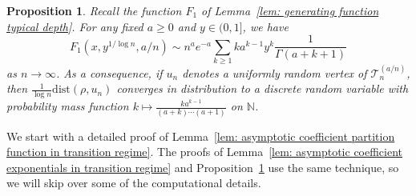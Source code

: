 \documentclass{article}
\newtheorem{proposition}[theorem]{Proposition}
\theoremstyle{remark}
\newcommand{\bN}{\mathbb{N}}
\newcommand{\dist}{\mathrm{dist}}
\newcommand{\cT}{\mathcal{T}}
\begin{document}
\begin{proposition}\label{prop: asymptotic coefficient typical depth in transition regime}
    Recall the function $F_1$ of Lemma~\ref{lem: generating function typical depth}.
    For any fixed $a\ge0$ and $y\in(0,1]$, we have
    \begin{equation*}
        [x^n] F_1{\left( x, y^{1/\log n}, a/n \right)} \sim n^{a} e^{-a} \sum_{k\ge1} k a^{k-1} y^{k} \frac{1}{\Gamma(a+k+1)}
    \end{equation*}
    as $n\to\infty$.
    As a consequence, if $u_n$ denotes a uniformly random vertex of $\cT_n^{(a/n)}$, then $\frac{1}{\log n} \dist(\rho,u_n)$ converges in distribution to a discrete random variable with probability mass function $k\mapsto \frac{k a^{k-1}}{(a+k)\cdots(a+1)}$ on $\bN$.
\end{proposition}

We start with a detailed proof of Lemma~\ref{lem: asymptotic coefficient partition function in transition regime}.
The proofs of Lemma~\ref{lem: asymptotic coefficient exponentials in transition regime} and Proposition~\ref{prop: asymptotic coefficient typical depth in transition regime} use the same technique, so we will skip over some of the computational details.
\end{document}
